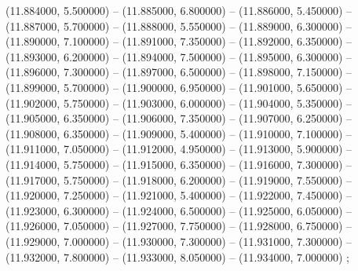 (11.884000, 5.500000) -- 
(11.885000, 6.800000) -- 
(11.886000, 5.450000) -- 
(11.887000, 5.700000) -- 
(11.888000, 5.550000) -- 
(11.889000, 6.300000) -- 
(11.890000, 7.100000) -- 
(11.891000, 7.350000) -- 
(11.892000, 6.350000) -- 
(11.893000, 6.200000) -- 
(11.894000, 7.500000) -- 
(11.895000, 6.300000) -- 
(11.896000, 7.300000) -- 
(11.897000, 6.500000) -- 
(11.898000, 7.150000) -- 
(11.899000, 5.700000) -- 
(11.900000, 6.950000) -- 
(11.901000, 5.650000) -- 
(11.902000, 5.750000) -- 
(11.903000, 6.000000) -- 
(11.904000, 5.350000) -- 
(11.905000, 6.350000) -- 
(11.906000, 7.350000) -- 
(11.907000, 6.250000) -- 
(11.908000, 6.350000) -- 
(11.909000, 5.400000) -- 
(11.910000, 7.100000) -- 
(11.911000, 7.050000) -- 
(11.912000, 4.950000) -- 
(11.913000, 5.900000) -- 
(11.914000, 5.750000) -- 
(11.915000, 6.350000) -- 
(11.916000, 7.300000) -- 
(11.917000, 5.750000) -- 
(11.918000, 6.200000) -- 
(11.919000, 7.550000) -- 
(11.920000, 7.250000) -- 
(11.921000, 5.400000) -- 
(11.922000, 7.450000) -- 
(11.923000, 6.300000) -- 
(11.924000, 6.500000) -- 
(11.925000, 6.050000) -- 
(11.926000, 7.050000) -- 
(11.927000, 7.750000) -- 
(11.928000, 6.750000) -- 
(11.929000, 7.000000) -- 
(11.930000, 7.300000) -- 
(11.931000, 7.300000) -- 
(11.932000, 7.800000) -- 
(11.933000, 8.050000) -- 
(11.934000, 7.000000) ;
